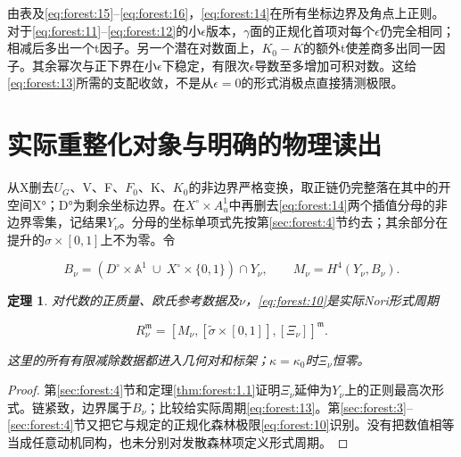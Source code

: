 \documentclass[11pt,a4paper,oneside]{ctexrep}
\theoremstyle{cnplain}
\newtheorem{theorem}{定理}[chapter]
\theoremstyle{definition}
\theoremstyle{remark}
\begin{document}
由表及\eqref{eq:forest:15}--\eqref{eq:forest:16}，\eqref{eq:forest:14}在所有坐标边界及角点上正则。对于\eqref{eq:forest:11}--\eqref{eq:forest:12}的小\(\epsilon \)版本，\(\gamma \)面的正规化首项对每个\(\epsilon \)仍完全相同；相减后多出一个t因子。另一个潜在对数面上，\(K_0- K\)的额外t使差商多出同一因子。其余幂次与正下界在小\(\epsilon \)下稳定，有限次\(\epsilon \)导数至多增加可积对数。这给\eqref{eq:forest:13}所需的支配收敛，不是从\(\epsilon =0\)的形式消极点直接猜测极限。

\section{实际重整化对象与明确的物理读出}\label{sec:forest:5}

从X删去\(U_G\)、V、F、\(F_0\)、K、\(K_0\)的非边界严格变换，取正链仍完整落在其中的开空间X°；D°为剩余坐标边界。在\(X^\circ\times A^{1}_u\)中再删去\eqref{eq:forest:14}两个插值分母的非边界零集，记结果\(Y_\nu \)。分母的坐标单项式先按第\ref{sec:forest:4}节约去；其余部分在提升的\(\sigma \times [0,1]\)上不为零。令

\begin{equation}
B_\nu=(D^\circ\times\mathbb A^1
            \ \cup\ X^\circ\times\{0,1\})\cap Y_\nu,\qquad
 M_\nu=H^4(Y_\nu,B_\nu).                                       \label{eq:forest:17}
\end{equation}

\begin{theorem}

\label{thm:forest:5.1} 对代数的正质量、欧氏参考数据及\(\nu \)，\eqref{eq:forest:10}是实际Nori形式周期

\begin{equation}
R_\nu^{\mathfrak m}
       =[M_\nu,[\widetilde\sigma\times[0,1]],[\Xi_\nu]]^{\mathfrak m}.       \label{eq:forest:18}
\end{equation}

这里的所有有限减除数据都进入几何对和标架；\(\kappa =\kappa _0\)时\(\Xi _\nu \)恒零。

\end{theorem}

\begin{proof}

第\ref{sec:forest:4}节和定理\ref{thm:forest:1.1}证明\(\Xi _\nu \)延伸为\(Y_\nu \)上的正则最高次形式。链紧致，边界属于\(B_\nu \)；比较给实际周期\eqref{eq:forest:13}。第\ref{sec:forest:3}--\ref{sec:forest:4}节又把它与规定的正规化森林极限\eqref{eq:forest:10}识别。没有把数值相等当成任意动机同构，也未分别对发散森林项定义形式周期。

\end{proof}
\end{document}

